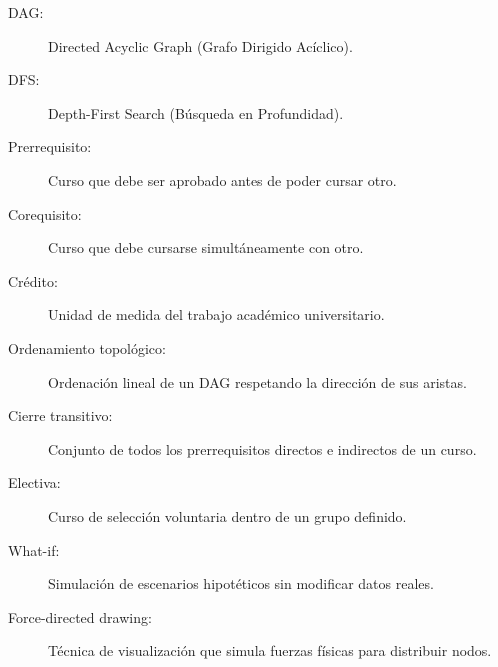 \documentclass[12pt]{report}
\begin{document}
\begin{description}
    \item[DAG:] Directed Acyclic Graph (Grafo Dirigido Acíclico).
    \item[DFS:] Depth-First Search (Búsqueda en Profundidad).
    \item[Prerrequisito:] Curso que debe ser aprobado antes de poder cursar otro.
    \item[Corequisito:] Curso que debe cursarse simultáneamente con otro.
    \item[Crédito:] Unidad de medida del trabajo académico universitario.
    \item[Ordenamiento topológico:] Ordenación lineal de un DAG respetando la dirección de sus aristas.
    \item[Cierre transitivo:] Conjunto de todos los prerrequisitos directos e indirectos de un curso.
    \item[Electiva:] Curso de selección voluntaria dentro de un grupo definido.
    \item[What-if:] Simulación de escenarios hipotéticos sin modificar datos reales.
    \item[Force-directed drawing:] Técnica de visualización que simula fuerzas físicas para distribuir nodos.
\end{description}
\end{document}
